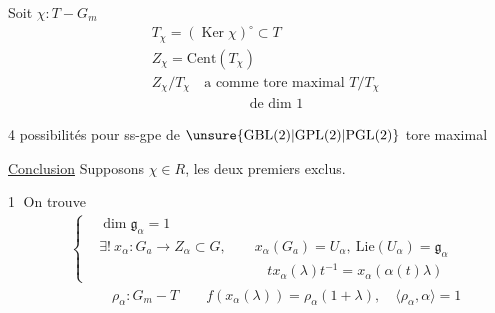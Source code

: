 Soit $\chi:T\mathbin{-}G_m$
\[
\begin{aligned}
&T_\chi=(\operatorname{Ker}\chi)^\circ\subset T\\
&Z_\chi=\mathrm{Cent}(T_\chi)\\
&Z_\chi/T_\chi\quad\text{a comme tore maximal }T/T_\chi\\
&\hspace{7em}\text{de dim }1
\end{aligned}
\]


4 possibilités pour ss-gpe de $\unsure{\mathrm{GBL}(2)|\mathrm{GPL}(2)|\mathrm{PGL}(2)}$  tore maximal

\uline{Conclusion} Supposons $\chi\in R$, les deux premiers  exclus.

\textcircled{1} On trouve
\[
\begin{aligned}
&\left\{\begin{aligned}
 &\dim\mathfrak g_\alpha=1\\
 &\exists !\ x_\alpha:G_a\longrightarrow Z_\alpha\subset G,\qquad
 x_\alpha(G_a)=U_\alpha,\ \mathrm{Lie}(U_\alpha)=\mathfrak g_\alpha\\
 &\hspace{12em}t x_\alpha(\lambda)t^{-1}=x_\alpha(\alpha(t)\lambda)
\end{aligned}\right.\\
&\hspace{3em}\rho_\alpha:G_m\mathbin{-}T\qquad f(x_\alpha(\lambda))=\rho_\alpha(1+\lambda),\quad
 \langle\rho_\alpha,\alpha\rangle=1
\end{aligned}
\]

